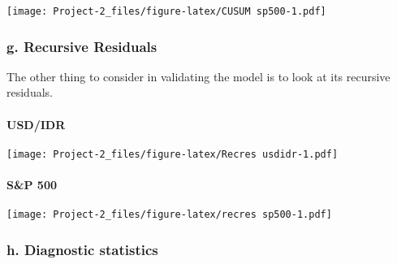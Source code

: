 \documentclass[]{article}
\newenvironment{Shaded}{\begin{snugshade}}{\end{snugshade}}
\newcommand{\KeywordTok}[1]{\textcolor[rgb]{0.13,0.29,0.53}{\textbf{#1}}}
\newcommand{\DataTypeTok}[1]{\textcolor[rgb]{0.13,0.29,0.53}{#1}}
\newcommand{\DecValTok}[1]{\textcolor[rgb]{0.00,0.00,0.81}{#1}}
\newcommand{\StringTok}[1]{\textcolor[rgb]{0.31,0.60,0.02}{#1}}
\newcommand{\OperatorTok}[1]{\textcolor[rgb]{0.81,0.36,0.00}{\textbf{#1}}}
\newcommand{\NormalTok}[1]{#1}
\let\oldparagraph\paragraph
\renewcommand{\paragraph}[1]{\oldparagraph{#1}\mbox{}}
\begin{document}
\texttt{[image: Project-2\_files/figure-latex/CUSUM sp500-1.pdf]}

\subsubsection{g. Recursive Residuals}\label{g.-recursive-residuals}

The other thing to consider in validating the model is to look at its
recursive residuals.

\paragraph{USD/IDR}\label{usdidr-1}

\begin{Shaded}
\end{Shaded}

\texttt{[image: Project-2\_files/figure-latex/Recres usdidr-1.pdf]}

\paragraph{S\&P 500}\label{sp-500-1}

\begin{Shaded}
\end{Shaded}

\texttt{[image: Project-2\_files/figure-latex/recres sp500-1.pdf]}

\subsubsection{h. Diagnostic statistics}\label{h.-diagnostic-statistics}
\end{document}
